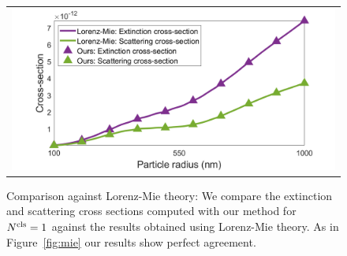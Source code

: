 \begin{figure}
    \centering
    \setlength{\resLen}{3.5in}
    \addtolength{\tabcolsep}{-3pt}
    \begin{tabular}{c}
        \includegraphics[width=\resLen]{images/pfunc/CsCt.png} 
    \end{tabular}
    \caption{
        Comparison against Lorenz-Mie theory: We compare the extinction and scattering cross sections computed with our method for ${N^\text{cls}}=1$ against the results obtained using Lorenz-Mie theory. As in Figure~\ref{fig:mie} our results show perfect agreement. 
    \label{fig:mie2}
}
\end{figure}
